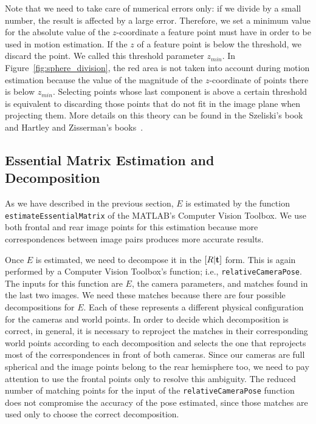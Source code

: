 Note that we need to take care of numerical errors only: if we divide by a 
small number, the result is affected by a large error. Therefore, we
set a minimum value for the absolute value of the $z$-coordinate a feature point must 
have in order to be used in motion estimation. If the $z$ of a
feature point is below the threshold, we discard the point.
%
We called this threshold parameter $z_{min}$.
In Figure~\ref{fig:sphere_division}, the red area is not taken into account 
during motion estimation because the value of the magnitude of the 
$z$-coordinate of points there 
is below $z_{min}$.
%
Selecting points whose last component is above a certain threshold is 
equivalent to discarding those points that do not fit in the image plane
when projecting them. More details on this theory can be found in the
Szeliski's book~\cite{szeliski2010computer} and Hartley and Zisserman's
books~\cite{Hartley2004}.

\subsection{Essential Matrix Estimation and Decomposition}\label{subsec:essential_estimation}
As we have described in the previous section, $E$ is estimated 
by the function {\tt estimateEssentialMatrix} of the MATLAB's 
Computer Vision Toolbox.
We use both frontal and rear image points for this estimation because
more correspondences between image pairs produces more accurate results.

Once $E$ is estimated, we need to decompose it in the 
\( [R|\mathbf{t} ] \) form. This is again performed by a Computer Vision 
Toolbox's function; i.e., {\tt relativeCameraPose}.
The inputs for this function are $E$, the camera parameters, and matches found in the last two images.
We need these matches because there are four possible decompositions for $E$. Each of these represents a different physical configuration for the cameras and world points.
In order to decide which decomposition is correct, in general, it is necessary to reproject the matches in their corresponding world points according to each 
decomposition and selects the one that reprojects most of the correspondences in 
front of both cameras.
Since our cameras are full spherical and the image points belong to the 
rear hemisphere too, we need to pay attention to use the frontal points only to resolve this ambiguity. 
The reduced number of matching points for the input of the 
{\tt relativeCameraPose} function does not compromise the accuracy of the pose 
estimated, since those matches are used only to choose the 
correct decomposition.

